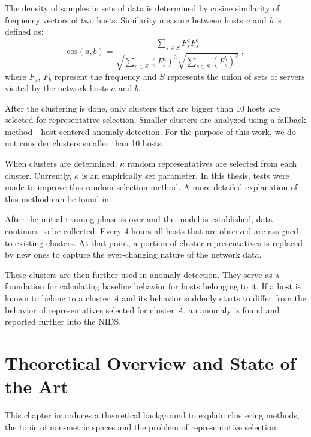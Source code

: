 \documentclass[thesis=B,english]{FITthesis}[2012/10/20]
\begin{document}
The density of samples in sets of data is determined by cosine similarity of frequency vectors of two hosts.
Similarity measure between hosts \textit{a} and \textit{b} is defined as:
\begin{equation}
\textrm{cos}(a, b) = \frac{\sum\limits_{s \in S} F_s^a F_s^b} {\sqrt{\sum\limits_{s \in S} (F_s^a)^2} \sqrt{\sum\limits_{s \in S} (F_s^b)^2}}\:,
\end{equation}
where $F_a$, $F_b$ represent the frequency and $S$ represents the union of sets of servers visited by the network hosts $a$ and $b$.

After the clustering is done, only clusters that are bigger than 10 hosts are selected for representative selection.
Smaller clusters are analyzed using a fallback method - host-centered anomaly detection.
For the purpose of this work, we do not consider clusters smaller than 10 hosts.

When clusters are determined, $\kappa$ random representatives are selected from each cluster.
Currently, $\kappa$ is an empirically set parameter.
In this thesis, tests were made to improve this random selection method.
A more detailed explanation of this method can be found in \cite{kopp2018community}.

After the initial training phase is over and the model is established, data continues to be collected.
Every 4 hours all hosts that are observed are assigned to existing clusters.
At that point, a portion of cluster representatives is replaced by new ones to capture the ever-changing nature of the network data.

These clusters are then further used in anomaly detection.
They serve as a foundation for calculating baseline behavior for hosts belonging to it.
If a host is known to belong to a cluster $A$ and its behavior suddenly starts to differ from the behavior of representatives selected for cluster $A$, an anomaly is found and reported further into the NIDS.


\chapter{Theoretical Overview and State of the Art}\label{ch:theory}

This chapter introduces a theoretical background to explain clustering methods, the topic of non-metric spaces and the problem of representative selection.
\end{document}
